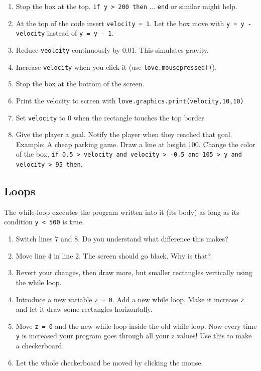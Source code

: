 \documentclass[a4paper, 11pt]{article}
\begin{document}
\begin{enumerate} 
\item Stop the box at the top. \texttt{if y > 200 then} ... \texttt{end} or similar might help.
\item At the top of the code insert \texttt{velocity = 1}. Let the box move with \texttt{y = y - velocity} instead of \texttt{y = y - 1}.
\item Reduce \texttt{veolcity} continuously by 0.01. This simulates gravity.
\item Increase \texttt{velocity} when you click it (use \texttt{love.mousepressed()}).
\item Stop the box at the bottom of the screen.
\item Print the velocity to screen with \texttt{love.graphics.print(velocity,10,10)}
\item Set \texttt{velocity} to 0 when the rectangle touches the top border.
\item Give the player a goal. Notify the player when they reached that goal. Example: A cheap parking game. Draw a line at height 100. Change the color of the box, \texttt{if 0.5 > velocity and velocity > -0.5 and 105 > y and velocity > 95 then}.
\end{enumerate}

\subsection{Loops}

The while-loop executes the program written into it (its body) as long as its condition \texttt{y < 500} is true.



\begin{enumerate}
\item Switch lines 7 and 8. Do you understand what difference this makes?
\item Move line 4 in line 2. The screen should go black. Why is that?
\item Revert your changes, then draw more, but smaller rectangles vertically using the while loop.
\item Introduce a new variable \texttt{z = 0}. Add a new while loop. Make it increase \texttt{z} and let it draw some rectangles horizontally.
\item Move \texttt{z = 0} and the new while loop inside the old while loop. Now every time \texttt{y} is increased your program goes through all your z values! Use this to make a checkerboard. 
\item Let the whole checkerboard be moved by clicking the mouse.
\end{enumerate}
\end{document}
